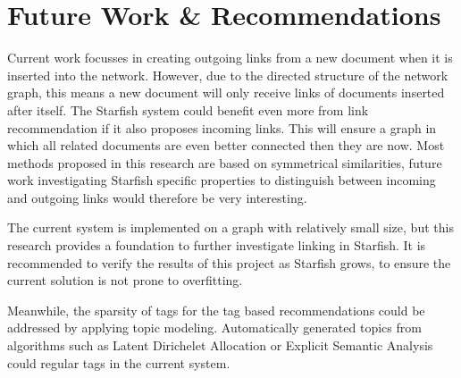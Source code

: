 \section{Future Work \& Recommendations}
Current work focusses in creating outgoing links from a new document when it is inserted into the network. However, due to the directed structure of the network graph, this means a new document will only receive links of documents inserted after itself. The Starfish system could benefit even more from link recommendation if it also proposes incoming links. This will ensure a graph in which all related documents are even better connected then they are now. Most methods proposed in this research are based on symmetrical similarities, future work investigating Starfish specific properties to distinguish between incoming and outgoing links would therefore be very interesting.

The current system is implemented on a graph with relatively small size, but this research provides a foundation to further investigate linking in Starfish. It is recommended to verify the results of this project as Starfish grows, to ensure the current solution is not prone to overfitting. 

Meanwhile, the sparsity of tags for the tag based recommendations could be addressed by applying topic modeling. Automatically generated topics from algorithms such as Latent Dirichelet Allocation or Explicit Semantic Analysis could regular tags in the current system.